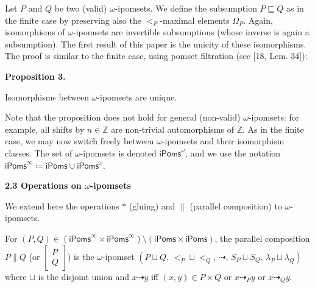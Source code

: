 \documentclass[10pt,a4paper]{article}
\begin{document}
 
 
Let $P$ and $Q$ be two (valid) $\omega$-ipomsets. We define the subsumption $P\sqsubseteq Q$ as in the finite case by preserving also the $<_{P}$-maximal elements $\Omega_{P}$. Again, isomorphisms of $\omega$-ipomsets are invertible subsumptions (whose inverse is again a subsumption). The first result of this paper is the unicity of these isomorphisms. The proof is similar to the finite case, using pomset filtration (see [18, Lem. 34]):\par
 
 
 
\par\medskip\noindent\textbf{Proposition 3.}\par
 
 
Isomorphisms between $\omega$-ipomsets are unique.\par
 
 
 
 
Note that the proposition does not hold for general (non-valid) $\omega$-ipomsets: for example, all shifts by $n\in\mathbb{Z}$ are non-trivial automorphisms of $\mathbb{Z}$. As in the finite case, we may now switch freely between $\omega$-ipomsets and their isomorphism classes. The set of $\omega$-ipomsets is denoted ${\mathsf{iPoms}^{\omega}}$, and we use the notation ${\mathsf{iPoms}^{\infty}}\coloneqq\mathsf{iPoms}\cup{\mathsf{iPoms}^{\omega}}$.\par
 
 
 
 
\par\medskip\noindent\textbf{2.3 Operations on $\omega$-ipomsets}\par
 
 
We extend here the operations $*$ (gluing) and $\parallel$ (parallel composition) to $\omega$-ipomsets.\par
 
 
 
For $(P,Q)\in({\mathsf{iPoms}^{\infty}}\times{\mathsf{iPoms}^{\infty}})\setminus(\mathsf{iPoms}\times\mathsf{iPoms})$, the parallel composition $P\parallel Q$ (or $\left[\begin{smallmatrix}P\\
Q\end{smallmatrix}\right]$) is the $\omega$-ipomset $(P\sqcup Q,\,<_{P}\sqcup<_{Q},\,\dashrightarrow,\,S_{P}\sqcup S_{Q},\,\lambda_{P}\sqcup\lambda_{Q})$ where $\sqcup$ is the disjoint union and $x\dashrightarrow y$ iff $(x,y)\in P\times Q$ or $x\dashrightarrow_{P}y$ or $x\dashrightarrow_{Q}y$.\par
 
\end{document}

